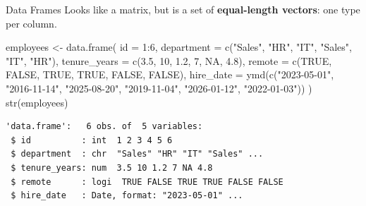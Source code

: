 \documentclass[
  ignorenonframetext,
  aspectratio=169,
]{beamer}
\newenvironment{Shaded}{\begin{snugshade}}{\end{snugshade}}
\newcommand{\AttributeTok}[1]{\textcolor[rgb]{0.40,0.45,0.13}{#1}}
\newcommand{\ConstantTok}[1]{\textcolor[rgb]{0.56,0.35,0.01}{#1}}
\newcommand{\DecValTok}[1]{\textcolor[rgb]{0.68,0.00,0.00}{#1}}
\newcommand{\FloatTok}[1]{\textcolor[rgb]{0.68,0.00,0.00}{#1}}
\newcommand{\FunctionTok}[1]{\textcolor[rgb]{0.28,0.35,0.67}{#1}}
\newcommand{\NormalTok}[1]{\textcolor[rgb]{0.00,0.23,0.31}{#1}}
\newcommand{\OtherTok}[1]{\textcolor[rgb]{0.00,0.23,0.31}{#1}}
\newcommand{\SpecialCharTok}[1]{\textcolor[rgb]{0.37,0.37,0.37}{#1}}
\newcommand{\StringTok}[1]{\textcolor[rgb]{0.13,0.47,0.30}{#1}}
\begin{document}
\begin{frame}[fragile]{Data Frames}
\protect\hypertarget{sec-dataframes}{}
Looks like a matrix, but is a set of \textbf{equal-length vectors}: one
type per column.

\begin{Shaded}
\begin{Highlighting}[]
\NormalTok{employees }\OtherTok{\textless{}{-}} \FunctionTok{data.frame}\NormalTok{(}
  \AttributeTok{id           =} \DecValTok{1}\SpecialCharTok{:}\DecValTok{6}\NormalTok{,}
  \AttributeTok{department   =} \FunctionTok{c}\NormalTok{(}\StringTok{"Sales"}\NormalTok{, }\StringTok{"HR"}\NormalTok{, }\StringTok{"IT"}\NormalTok{, }\StringTok{"Sales"}\NormalTok{, }\StringTok{"IT"}\NormalTok{, }\StringTok{"HR"}\NormalTok{),}
  \AttributeTok{tenure\_years =} \FunctionTok{c}\NormalTok{(}\FloatTok{3.5}\NormalTok{, }\DecValTok{10}\NormalTok{, }\FloatTok{1.2}\NormalTok{, }\DecValTok{7}\NormalTok{, }\ConstantTok{NA}\NormalTok{, }\FloatTok{4.8}\NormalTok{),}
  \AttributeTok{remote       =} \FunctionTok{c}\NormalTok{(}\ConstantTok{TRUE}\NormalTok{, }\ConstantTok{FALSE}\NormalTok{, }\ConstantTok{TRUE}\NormalTok{, }\ConstantTok{TRUE}\NormalTok{, }\ConstantTok{FALSE}\NormalTok{, }\ConstantTok{FALSE}\NormalTok{),}
  \AttributeTok{hire\_date    =} \FunctionTok{ymd}\NormalTok{(}\FunctionTok{c}\NormalTok{(}\StringTok{"2023{-}05{-}01"}\NormalTok{, }\StringTok{"2016{-}11{-}14"}\NormalTok{, }\StringTok{"2025{-}08{-}20"}\NormalTok{,}
                       \StringTok{"2019{-}11{-}04"}\NormalTok{, }\StringTok{"2026{-}01{-}12"}\NormalTok{, }\StringTok{"2022{-}01{-}03"}\NormalTok{))}
\NormalTok{)}
\FunctionTok{str}\NormalTok{(employees)}
\end{Highlighting}
\end{Shaded}

\begingroup\tiny\color{darkgray}

\begin{verbatim}
'data.frame':   6 obs. of  5 variables:
 $ id          : int  1 2 3 4 5 6
 $ department  : chr  "Sales" "HR" "IT" "Sales" ...
 $ tenure_years: num  3.5 10 1.2 7 NA 4.8
 $ remote      : logi  TRUE FALSE TRUE TRUE FALSE FALSE
 $ hire_date   : Date, format: "2023-05-01" ...
\end{verbatim}

\endgroup
\end{frame}
\end{document}
